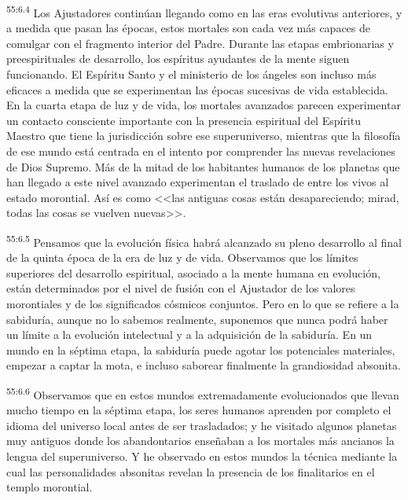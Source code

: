 \par
\textsuperscript{55:6.4} Los Ajustadores continúan llegando como en las eras evolutivas anteriores, y a medida que pasan las épocas, estos mortales son cada vez más capaces de comulgar con el fragmento interior del Padre. Durante las etapas embrionarias y preespirituales de desarrollo, los espíritus ayudantes de la mente siguen funcionando. El Espíritu Santo y el ministerio de los ángeles son incluso más eficaces a medida que se experimentan las épocas sucesivas de vida establecida. En la cuarta etapa de luz y de vida, los mortales avanzados parecen experimentar un contacto consciente importante con la presencia espiritual del Espíritu Maestro que tiene la jurisdicción sobre ese superuniverso, mientras que la filosofía de ese mundo está centrada en el intento por comprender las nuevas revelaciones de Dios Supremo. Más de la mitad de los habitantes humanos de los planetas que han llegado a este nivel avanzado experimentan el traslado de entre los vivos al estado morontial. Así es como <<las antiguas cosas están desapareciendo; mirad, todas las cosas se vuelven nuevas>>.

\par
\textsuperscript{55:6.5} Pensamos que la evolución física habrá alcanzado su pleno desarrollo al final de la quinta época de la era de luz y de vida. Observamos que los límites superiores del desarrollo espiritual, asociado a la mente humana en evolución, están determinados por el nivel de fusión con el Ajustador de los valores morontiales y de los significados cósmicos conjuntos. Pero en lo que se refiere a la sabiduría, aunque no lo sabemos realmente, suponemos que nunca podrá haber un límite a la evolución intelectual y a la adquisición de la sabiduría. En un mundo en la séptima etapa, la sabiduría puede agotar los potenciales materiales, empezar a captar la mota, e incluso saborear finalmente la grandiosidad absonita.

\par
\textsuperscript{55:6.6} Observamos que en estos mundos extremadamente evolucionados que llevan mucho tiempo en la séptima etapa, los seres humanos aprenden por completo el idioma del universo local antes de ser trasladados; y he visitado algunos planetas muy antiguos donde los abandontarios enseñaban a los mortales más ancianos la lengua del superuniverso. Y he observado en estos mundos la técnica mediante la cual las personalidades absonitas revelan la presencia de los finalitarios en el templo morontial.

